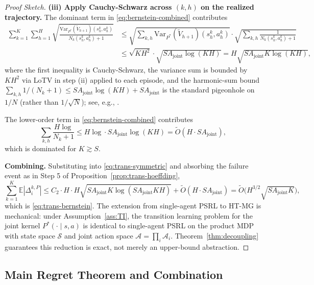 \documentclass{article}
\begin{document}
\begin{proof}[Proof Sketch]
\textbf{(iii) Apply Cauchy-Schwarz across $(k, h)$ on the realized trajectory.} The dominant term in \eqref{eq:bernstein-combined} contributes
\begin{align}
\sum_{k=1}^K \sum_{h=1}^H \sqrt{\frac{\mathrm{Var}_{P^*}(\widetilde{V}_{h+1})(s_h^k, a_h^k)}{N_k(s_h^k, a_h^k) + 1}} &\leq \sqrt{\sum_{k,h} \mathrm{Var}_{P^*}(\widetilde{V}_{h+1})(s_h^k, a_h^k)} \cdot \sqrt{\sum_{k,h} \frac{1}{N_k(s_h^k, a_h^k) + 1}} \\
&\leq \sqrt{KH^2} \cdot \sqrt{SA_{\mathrm{joint}} \log(KH)} = H\sqrt{SA_{\mathrm{joint}} K \log(KH)},
\end{align}
where the first inequality is Cauchy-Schwarz, the variance sum is bounded by $KH^2$ via LoTV in step (ii) applied to each episode, and the harmonic-sum bound $\sum_{k,h} 1/(N_k+1) \leq SA_{\mathrm{joint}} \log(KH) + SA_{\mathrm{joint}}$ is the standard pigeonhole on $1/N$ (rather than $1/\sqrt{N}$); see, e.g., \citet[Section 3.3]{lattimore2020bandit}.

The lower-order term in \eqref{eq:bernstein-combined} contributes
\begin{equation}
\sum_{k,h} \frac{H \log}{N_k + 1} \leq H \log \cdot SA_{\mathrm{joint}} \log(KH) = \tilde{O}(H \cdot SA_{\mathrm{joint}}),
\end{equation}
which is dominated for $K \gtrsim S$.

\textbf{Combining.} Substituting into \eqref{eq:trans-symmetric} and absorbing the failure event as in Step 5 of Proposition~\ref{prop:trans-hoeffding},
\begin{equation}
\sum_{k=1}^K \mathbb{E}|\Delta_i^{k,P}| \leq C_2 \cdot H \cdot H\sqrt{SA_{\mathrm{joint}} K \log(SA_{\mathrm{joint}}KH)} + \tilde{O}(H \cdot SA_{\mathrm{joint}}) = \tilde{O}\big(H^{3/2}\sqrt{SA_{\mathrm{joint}} K}\big),
\end{equation}
which is \eqref{eq:trans-bernstein}. The extension from single-agent PSRL to HT-MG is mechanical: under Assumption~\ref{ass:TI}, the transition learning problem for the joint kernel $P^*(\cdot \mid s, a)$ is identical to single-agent PSRL on the product MDP with state space $\mathcal{S}$ and joint action space $\mathcal{A} = \prod_i \mathcal{A}_i$. Theorem~\ref{thm:decoupling} guarantees this reduction is exact, not merely an upper-bound abstraction.
\end{proof}

\subsection{Main Regret Theorem and Combination}
\end{document}
